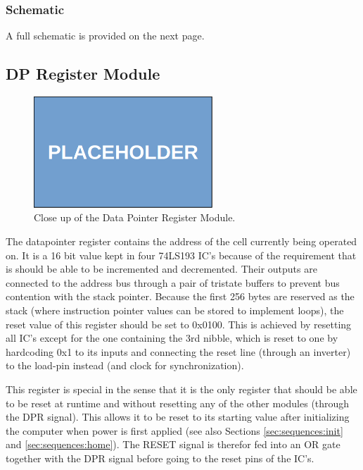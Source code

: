 \subsubsection{Schematic}
A full schematic is provided on the next page.



\subsection{DP Register Module}
\begin{figure}[H]
  \centering
  \includegraphics[width=0.6\textwidth]{img/placeholder}
  \caption{Close up of the Data Pointer Register Module.}
  \label{fig:dpregcloseup}
\end{figure}

The datapointer register contains the address of the cell currently being operated on. It is a 16 bit value kept in four 74LS193 IC's because of the requirement that is should be able to be incremented and decremented. Their outputs are connected to the address bus through a pair of tristate buffers to prevent bus contention with the stack pointer. Because the first 256 bytes are reserved as the stack (where instruction pointer values can be stored to implement loops), the reset value of this register should be set to 0x0100. This is achieved by resetting all IC's except for the one containing the 3rd nibble, which is reset to one by hardcoding 0x1 to its inputs and connecting the reset line (through an inverter) to the load-pin instead (and clock for synchronization).

This register is special in the sense that it is the only register that should be able to be reset at runtime and without resetting any of the other modules (through the DPR signal). This allows it to be reset to its starting value after initializing the computer when power is first applied (see also Sections \ref{sec:sequences:init} and \ref{sec:sequences:home}). The RESET signal is therefor fed into an OR gate together with the DPR signal before going to the reset pins of the IC's.

